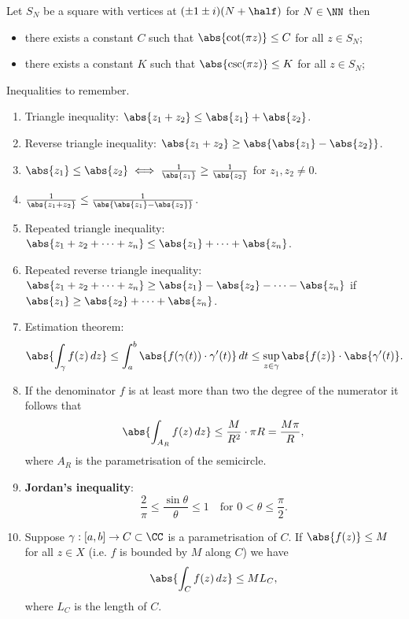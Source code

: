 \documentclass[12pt, a4paper]{article}
\begin{document}
\begin{proposition}
    Let \(S_N\) be a square with vertices at \((\pm 1 \pm i)(N+\half)\) for \(N \in \NN\) then 
    \begin{itemize}
        \item there exists a constant \(C\) such that \(\abs{\cot(\pi z)}\leq C\) for all \(z \in S_N\);
        \item there exists a constant \(K\) such that \(\abs{\csc(\pi z)}\leq K\) for all \(z \in S_N\);
    \end{itemize}
\end{proposition}

\begin{mdprop}
    Inequalities to remember.
    \begin{enumerate}
        \item Triangle inequality: \(\abs{z_1+z_2} \leq \abs{z_1}+\abs{z_2}\).
        \item Reverse triangle inequality: \(\abs{z_1+z_2} \geq \abs{\abs{z_1}-\abs{z_2}}\).
        \item \(\abs{z_1} \leq \abs{z_2} \iff \frac{1}{\abs{z_1}} \geq \frac{1}{\abs{z_2}}\) for \(z_1,z_2 \neq 0\).
        \item \(\frac{1}{\abs{z_1+z_2}} \leq \frac{1}{\abs{\abs{z_1}-\abs{z_2}}}\).
        \item Repeated triangle inequality: \(\abs{z_1+z_2+ \cdots +z_n} \leq \abs{z_1}+\cdots+ \abs{z_n}\).
        \item Repeated reverse triangle inequality: \(\abs{z_1+z_2+ \cdots +z_n} \geq \abs{z_1}-\abs{z_2}- \cdots - \abs{z_n}\) if \(\abs{z_1} \geq \abs{z_2}+\cdots +\abs{z_n}\).
        \item Estimation theorem:
        \[\abs{\int_{\gamma} f(z) \, dz} \leq \int_{a}^{b} \abs{f(\gamma(t)) \cdot \gamma'(t)} \, dt \leq \sup_{z \in \gamma} \abs{f(z)} \cdot \abs{\gamma'(t)}.\]
        \item If the denominator \(f\) is at least more than two the degree of the numerator it follows that 
        \[\abs{\int_{A_R} f(z) \, dz} \leq \frac{M}{R^2} \cdot \pi R = \frac{M\pi}{R},\]
        where \(A_R\) is the parametrisation of the semicircle.
        \item \textbf{Jordan's inequality}:
        \[\frac{2}{\pi} \leq \frac{\sin\theta}{\theta}\leq 1 \quad \text{for } 0 < \theta \leq \frac{\pi}{2}.\]
        \item Suppose \(\gamma:[a,b] \to C \subset \CC\) is a parametrisation of \(C\). If \(\abs{f(z)}\leq M\) for all \(z \in X\) (i.e. \(f\) is bounded by \(M\) along \(C\)) we have 
        \[\abs{\int_C f(z) \, dz} \leq M L_C,\]
        where \(L_C\) is the length of \(C\).
    \end{enumerate}
\end{mdprop}
\end{document}
